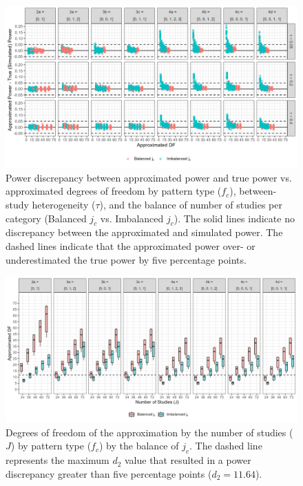 \begin{figure}
    \centering
    \vspace{-5pt}\includegraphics[width=\linewidth]{chapters/plots/df_mean.png}\caption{Power discrepancy between approximated power and true power vs. approximated degrees of freedom by pattern type ($f_c$), between-study heterogeneity ($\tau$), and the balance of number of studies per category (Balanced $j_c$ vs. Imbalanced $j_c$). The solid lines indicate no discrepancy between the approximated and simulated power. The dashed lines indicate that the approximated power over- or underestimated the true power by five percentage points. \label{fig: df_mean}}
    \vspace{-5pt}
\end{figure}  


\begin{figure}
    \centering
    \vspace{-5pt}
    \includegraphics[width=\linewidth]{chapters/plots/dfvJ.png}
    \caption{Degrees of freedom of the approximation by the number of studies ($J$) by pattern type ($f_c$) by the balance of $j_c$. The dashed line represents the maximum $d_2$ value that resulted in a power discrepancy greater than five percentage points ($d_2 = 11.64$). \label{fig:dfvJ}}
    \vspace{-5pt}
\end{figure}

